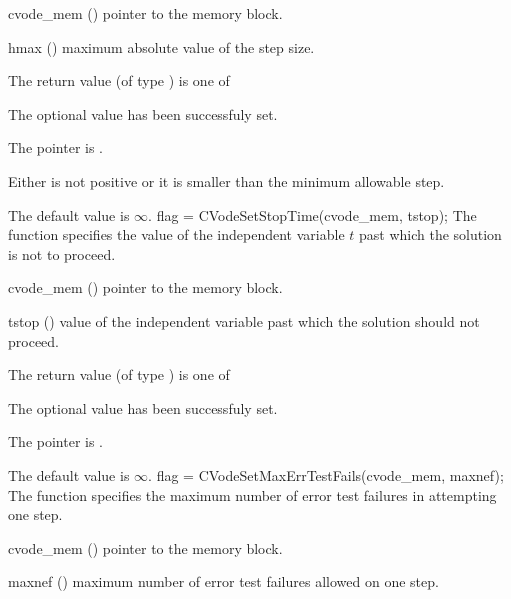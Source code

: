 {
  \begin{args}
  \item[cvode\_mem] ()
    pointer to the {\cvodes} memory block.
  \item[hmax] ()
    maximum absolute value of the step size.
  \end{args}
}
{
  The return value  (of type ) is one of
  \begin{args}
  \item[\Id{SUCCESS}] 
    The optional value has been successfuly set.
  \item[\Id{CVS\_NO\_MEM}]
    The  pointer is .
  \item[\Id{CVS\_ILL\_INPUT}]
    Either  is not positive or it is smaller than the minimum allowable step.
  \end{args}
}
{
  The default value is $\infty$.
}
{
flag = CVodeSetStopTime(cvode\_mem, tstop);
}
{
  The function  specifies the value of the
  independent variable $t$ past which the solution is not to proceed.
}
{
  \begin{args}
  \item[cvode\_mem] ()
    pointer to the {\cvodes} memory block.
  \item[tstop] ()
    value of the independent variable past which the solution should
    not proceed.
  \end{args}
}
{
  The return value  (of type ) is one of
  \begin{args}
  \item[\Id{SUCCESS}] 
    The optional value has been successfuly set.
  \item[\Id{CVS\_NO\_MEM}]
    The  pointer is .
  \end{args}
}
{
  The default value is $\infty$.
}
{
flag = CVodeSetMaxErrTestFails(cvode\_mem, maxnef);
}
{
  The function  specifies the
  maximum number of error test failures in attempting one step.
}
{
  \begin{args}
  \item[cvode\_mem] ()
    pointer to the {\cvodes} memory block.
  \item[maxnef] ()
    maximum number of error test failures allowed on one step.
  \end{args}
}
